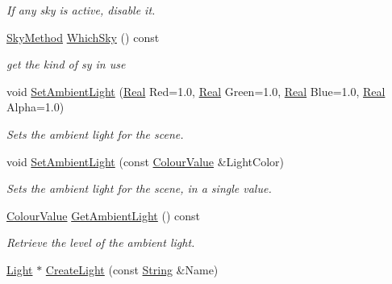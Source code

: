 \begin{DoxyCompactItemize}
\begin{DoxyCompactList}\small\item\em If any sky is active, disable it. \item\end{DoxyCompactList}\item 
\hyperlink{classphys_1_1SceneManager_a91dd086aabaab926d070c65fc14828d6}{SkyMethod} \hyperlink{classphys_1_1SceneManager_a39155e9eaa52789884fcc54d93f8cf3a}{WhichSky} () const 
\begin{DoxyCompactList}\small\item\em get the kind of sy in use \item\end{DoxyCompactList}\item 
void \hyperlink{classphys_1_1SceneManager_a686b7199aff8db87af84f40ec933809a}{SetAmbientLight} (\hyperlink{namespacephys_af7eb897198d265b8e868f45240230d5f}{Real} Red=1.0, \hyperlink{namespacephys_af7eb897198d265b8e868f45240230d5f}{Real} Green=1.0, \hyperlink{namespacephys_af7eb897198d265b8e868f45240230d5f}{Real} Blue=1.0, \hyperlink{namespacephys_af7eb897198d265b8e868f45240230d5f}{Real} Alpha=1.0)
\begin{DoxyCompactList}\small\item\em Sets the ambient light for the scene. \item\end{DoxyCompactList}\item 
void \hyperlink{classphys_1_1SceneManager_af5af99740fefeb411caff8fd004b4103}{SetAmbientLight} (const \hyperlink{classphys_1_1ColourValue}{ColourValue} \&LightColor)
\begin{DoxyCompactList}\small\item\em Sets the ambient light for the scene, in a single value. \item\end{DoxyCompactList}\item 
\hyperlink{classphys_1_1ColourValue}{ColourValue} \hyperlink{classphys_1_1SceneManager_a4ab204cf9bdfe267561ba2710108c68f}{GetAmbientLight} () const 
\begin{DoxyCompactList}\small\item\em Retrieve the level of the ambient light. \item\end{DoxyCompactList}\item 
\hyperlink{classphys_1_1Light}{Light} $\ast$ \hyperlink{classphys_1_1SceneManager_aaf14df62a5d6c55c3307d154a0caf5ea}{CreateLight} (const \hyperlink{namespacephys_aa03900411993de7fbfec4789bc1d392e}{String} \&Name)

\end{DoxyCompactItemize}
